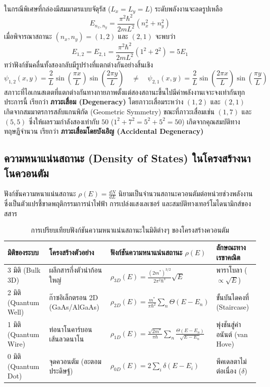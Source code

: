 ในกรณีพิเศษที่กล่องมีสมมาตรแบบจัตุรัส ($L_x = L_y = L$) ระดับพลังงานจะลดรูปเหลือ
\begin{equation}
E_{n_x, n_y} = \frac{\pi^2\hbar^2}{2mL^2}(n_x^2 + n_y^2)
\end{equation}
เมื่อพิจารณาสถานะ $(n_x, n_y) = (1, 2)$ และ $(2, 1)$ จะพบว่า
\begin{equation}
E_{1, 2} = E_{2, 1} = \frac{\pi^2\hbar^2}{2mL^2}(1^2 + 2^2) = 5 E_1
\end{equation}
ทว่าฟังก์ชันคลื่นทั้งสองกลับมีรูปร่างที่แตกต่างกันอย่างสิ้นเชิง
\begin{equation}
\psi_{1, 2}(x, y) = \frac{2}{L}\sin\left(\frac{\pi x}{L}\right)\sin\left(\frac{2\pi y}{L}\right) \quad \ne \quad \psi_{2, 1}(x, y) = \frac{2}{L}\sin\left(\frac{2\pi x}{L}\right)\sin\left(\frac{\pi y}{L}\right)
\end{equation}
สภาวะที่ไอเกนสเตตที่แตกต่างกันทางกายภาพตั้งแต่สองสถานะขึ้นไปมีค่าพลังงานเจาะจงเท่ากันทุกประการนี้ เรียกว่า \textbf{ภาวะเสื่อม (Degeneracy)} โดยภาวะเสื่อมระหว่าง $(1, 2)$ และ $(2, 1)$ เกิดจากสมมาตรการสลับแกนพิกัด (Geometric Symmetry) ขณะที่ภาวะเสื่อมเช่น $(1, 7)$ และ $(5, 5)$ ซึ่งให้ผลรวมกำลังสองเท่ากับ $50$ ($1^2 + 7^2 = 5^2 + 5^2 = 50$) เกิดจากคุณสมบัติทางทฤษฎีจำนวน เรียกว่า \textbf{ภาวะเสื่อมโดยบังเอิญ (Accidental Degeneracy)}

\subsection{ความหนาแน่นสถานะ (Density of States) ในโครงสร้างนาโนควอนตัม}
ฟังก์ชันความหนาแน่นสถานะ $\rho(E) = \frac{dN}{dE}$ นิยามเป็นจำนวนสถานะควอนตัมต่อหน่วยช่วงพลังงาน ซึ่งเป็นตัวแปรชี้ขาดพฤติกรรมการนำไฟฟ้า การเปล่งแสงเลเซอร์ และสมบัติทางเทอร์โมไดนามิกส์ของสสาร

\begin{table}[H]
\centering
\caption{การเปรียบเทียบฟังก์ชันความหนาแน่นสถานะในมิติต่างๆ ของโครงสร้างควอนตัม}
\label{tab_density_of_states}
\begin{tabular}{llll}
\toprule
\textbf{มิติของระบบ} & \textbf{โครงสร้างตัวอย่าง} & \textbf{ฟังก์ชันความหนาแน่นสถานะ $\rho(E)$} & \textbf{ลักษณะทางเรขาคณิต} \\
\midrule
3 มิติ (Bulk 3D) & ผลึกสารกึ่งตัวนำก้อนใหญ่ & $\rho_{3D}(E) = \frac{(2m^*)^{3/2}}{2\pi^2\hbar^3}\sqrt{E}$ & พาราโบลา ($\propto \sqrt{E}$) \\
2 มิติ (Quantum Well) & ก๊าซอิเล็กตรอน 2D (GaAs/AlGaAs) & $\rho_{2D}(E) = \frac{m^*}{\pi\hbar^2}\sum_n \Theta(E - E_n)$ & ขั้นบันไดคงที่ (Staircase) \\
1 มิติ (Quantum Wire) & ท่อนาโนคาร์บอน เส้นลวดนาโน & $\rho_{1D}(E) = \frac{\sqrt{2m^*}}{\pi\hbar}\sum_n \frac{\Theta(E - E_n)}{\sqrt{E - E_n}}$ & พุ่งชันสู่ค่าอนันต์ (van Hove) \\
0 มิติ (Quantum Dot) & จุดควอนตัม (อะตอมประดิษฐ์) & $\rho_{0D}(E) = 2\sum_i \delta(E - E_i)$ & พีคเดลตาไม่ต่อเนื่อง ($\delta$) \\
\bottomrule
\end{tabular}
\end{table}

